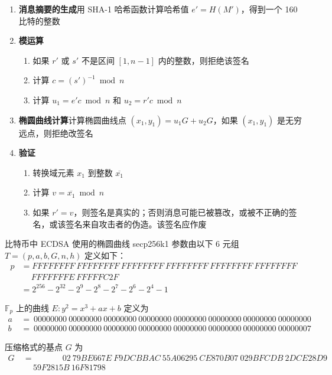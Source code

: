 \documentclass[a4paper,10pt]{article}
\begin{document}
\begin{enumerate}
  \item \textbf{消息摘要的生成}\quad 用 SHA-1 哈希函数计算哈希值 \(e'=H(M')\)，得到一个 160 比特的整数
  \item \textbf{模运算}
    \begin{enumerate}
      \item 如果 \(r'\) 或 \(s'\) 不是区间 \([1,n-1]\) 内的整数，则拒绝该签名
      \item 计算 \(c=(s')^{-1} \bmod n\)
      \item 计算 \(u_1=e'c\bmod n\) 和 \(u_2=r'c\bmod n\)
    \end{enumerate}
  \item \textbf{椭圆曲线计算}\quad 计算椭圆曲线点 \((x_1,y_1)=u_1G+u_2G\)，如果 \((x_1,y_1)\) 是无穷远点，则拒绝改签名
  \item \textbf{验证}
    \begin{enumerate}
      \item 转换域元素 \(x_1\) 到整数 \(\overline{x_1}\)
      \item 计算 \(v=\overline{x_1}\bmod n\)
      \item 如果 \(r'=v\)，则签名是真实的；否则消息可能已被篡改，或被不正确的签名，或该签名来自攻击者的伪造。该签名应作废
    \end{enumerate}
\end{enumerate}

比特币中 ECDSA 使用的椭圆曲线 secp256k1 参数由以下 6 元组 \(T=(p,a,b,G,n,h)\) 定义如下：
\begin{align*}
  p &= FFFFFFFF\ FFFFFFFF\ FFFFFFFF\ FFFFFFFF\ FFFFFFFF\ FFFFFFFF\\
    &\quad\ FFFFFFFE\ FFFFFC2F \\
    &= 2^{256} − 2^{32} − 2^9 − 2^8 − 2^7 − 2^6 − 2^4 − 1  
\end{align*}

\(\mathbb{F}_p\) 上的曲线 \(E: y^2 = x^3+ax+b\) 定义为
\begin{align*}
a\ &=\ 00000000\ 00000000\ 00000000\ 00000000\ 00000000\ 00000000\ 00000000\ 00000000\ \\
b\ &=\ 00000000\ 00000000\ 00000000\ 00000000\ 00000000\ 00000000\ 00000000\ 00000007
\end{align*}

压缩格式的基点 \(G\) 为 
\begin{align*}
G\ &=\quad \qquad\ \ 02\ 79BE667E\ F9DCBBAC\ 55A06295\ CE870B07\ 029BFCDB\ 2DCE28D9 \\
   &\ \quad 59F2815B\ 16F81798
\end{align*}
\end{document}
